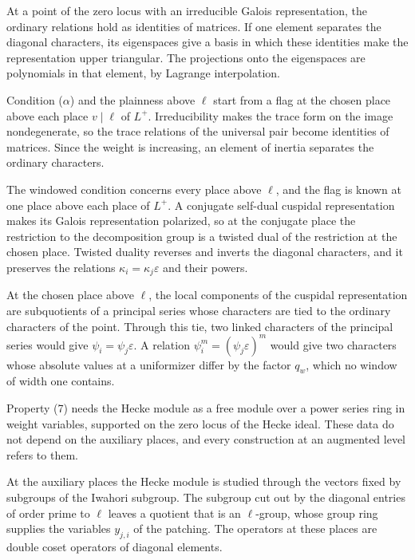 At a point of the zero locus with an irreducible Galois representation, the ordinary relations hold as identities of matrices. If one element separates the diagonal characters, its eigenspaces give a basis in which these identities make the representation upper triangular. The projections onto the eigenspaces are polynomials in that element, by Lagrange interpolation.

Condition ($\alpha$) and the plainness above $\ell$ start from a flag at the chosen place above each place $v\mid\ell$ of $L^+$. Irreducibility makes the trace form on the image nondegenerate, so the trace relations of the universal pair become identities of matrices. Since the weight is increasing, an element of inertia separates the ordinary characters.

The windowed condition concerns every place above $\ell$, and the flag is known at one place above each place of $L^+$. A conjugate self-dual cuspidal representation makes its Galois representation polarized, so at the conjugate place the restriction to the decomposition group is a twisted dual of the restriction at the chosen place. Twisted duality reverses and inverts the diagonal characters, and it preserves the relations $\kappa_i=\kappa_j\varepsilon$ and their powers.

At the chosen place above $\ell$, the local components of the cuspidal representation are subquotients of a principal series whose characters are tied to the ordinary characters of the point. Through this tie, two linked characters of the principal series would give $\psi_i=\psi_j\varepsilon$. A relation $\psi_i^m=(\psi_j\varepsilon)^m$ would give two characters whose absolute values at a uniformizer differ by the factor $q_w$, which no window of width one contains.

Property (7) needs the Hecke module as a free module over a power series ring in weight variables, supported on the zero locus of the Hecke ideal. These data do not depend on the auxiliary places, and every construction at an augmented level refers to them.

At the auxiliary places the Hecke module is studied through the vectors fixed by subgroups of the Iwahori subgroup. The subgroup cut out by the diagonal entries of order prime to $\ell$ leaves a quotient that is an $\ell$-group, whose group ring supplies the variables $y_{j,i}$ of the patching. The operators at these places are double coset operators of diagonal elements.

